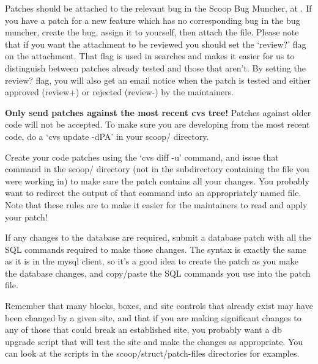 Patches should be attached to the relevant bug in the Scoop Bug Muncher, at . If you have a patch for a new feature which has no corresponding bug in the bug muncher, create the bug, assign it to yourself, then attach the file. Please note that if you want the attachment to be reviewed you should set the `review?' flag on the attachment. That flag is used in searches and makes it easier for us to distinguish between patches already tested and those that aren't. By setting the review? flag, you will also get an email notice when the patch is tested and either approved (review+) or rejected (review-) by the maintainers.

{\bf Only send patches against the most recent cvs tree!} Patches against older code will not be accepted. To make sure you are developing from the most recent code, do a `cvs update -dPA' in your scoop/ directory.

Create your code patches using the `cvs diff -u' command, and issue that command in the scoop/ directory (not in the subdirectory containing the file you were working in) to make sure the patch contains all your changes. You probably want to redirect the output of that command into an appropriately named file. Note that these rules are to make it easier for the maintainers to read and apply your patch!

If any changes to the database are required, submit a database patch with all the SQL commands required to make those changes. The syntax is exactly the same as it is in the mysql client, so it's a good idea to create the patch as you make the database changes, and copy/paste the SQL commands you use into the patch file.

Remember that many blocks, boxes, and site controls that already exist may have been changed by a given site, and that if you are making significant changes to any of those that could break an established site, you probably want a db upgrade script that will test the site and make the changes as appropriate. You can look at the scripts in the scoop/struct/patch-files directories for examples.


